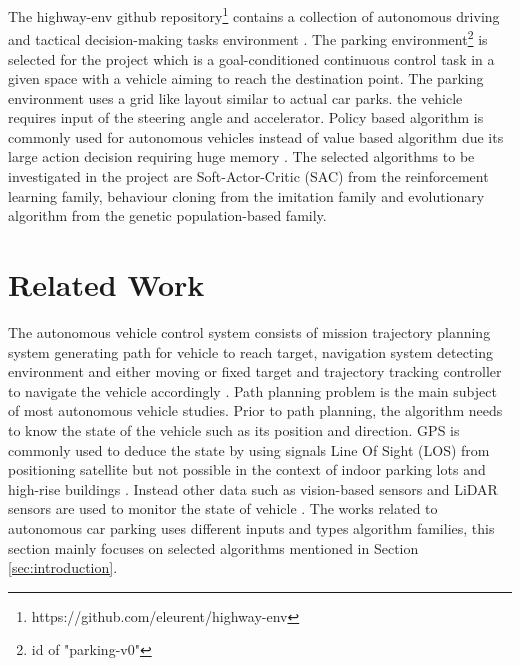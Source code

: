 \documentclass{svproc}
\begin{document}
The highway-env github repository\footnote{https://github.com/eleurent/highway-env} contains a collection of autonomous driving and tactical decision-making tasks environment \cite{highway-env}. The parking environment\footnote{id of "parking-v0"} is selected for the project which is a goal-conditioned continuous control task in a given space with a vehicle aiming to reach the destination point. The parking environment uses a grid like layout similar to actual car parks. the vehicle requires input of the steering angle and accelerator. Policy based algorithm is commonly used for autonomous vehicles instead of value based algorithm due its large action decision requiring huge memory \cite{takehara2021autonomous}.
The selected algorithms to be investigated in the project are Soft-Actor-Critic (SAC) from the reinforcement learning family, behaviour cloning from the imitation family and evolutionary algorithm from the genetic population-based family.

\section{Related Work}
The autonomous vehicle control system consists of mission trajectory planning system generating path for vehicle to reach target, navigation system detecting environment and either moving or fixed target and trajectory tracking controller to navigate the vehicle accordingly \cite{lin2018path}. Path planning problem is the main subject of most autonomous vehicle studies. Prior to path planning, the algorithm needs to know the state of the vehicle such as its position and direction. GPS is commonly used to deduce the state by using signals Line Of Sight (LOS) from positioning satellite but not possible in the context of indoor parking lots \cite{correa2017autonomous} and high-rise buildings \cite{saksena2019towards}. Instead other data such as vision-based sensors and LiDAR sensors are used to monitor the state of vehicle \cite{chan2021review}. The works related to autonomous car parking uses different inputs and types algorithm families, this section mainly focuses on selected algorithms mentioned in Section \ref{sec:introduction}.
\end{document}
